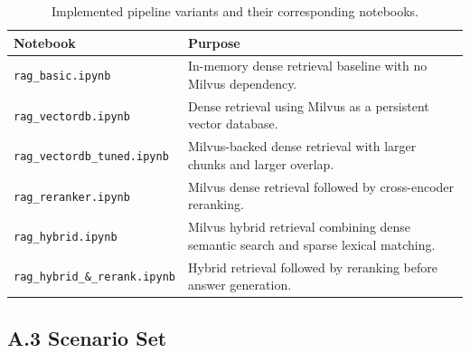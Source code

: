 \begin{table}[H]
\centering
\small
\begin{tabularx}{\textwidth}{>{\raggedright\arraybackslash}p{}>{\raggedright\arraybackslash}X}
\toprule
\textbf{Notebook} & \textbf{Purpose} \\
\midrule
\texttt{rag\_basic.ipynb} & In-memory dense retrieval baseline with no Milvus dependency. \\
\texttt{rag\_vectordb.ipynb} & Dense retrieval using Milvus as a persistent vector database. \\
\texttt{rag\_vectordb\_tuned.ipynb} & Milvus-backed dense retrieval with larger chunks and larger overlap. \\
\texttt{rag\_reranker.ipynb} & Milvus dense retrieval followed by cross-encoder reranking. \\
\texttt{rag\_hybrid.ipynb} & Milvus hybrid retrieval combining dense semantic search and sparse lexical matching. \\
\texttt{rag\_hybrid\_\&\_rerank.ipynb} & Hybrid retrieval followed by reranking before answer generation. \\
\bottomrule
\end{tabularx}
\caption{Implemented pipeline variants and their corresponding notebooks.}
\label{tab:appendix-pipeline-summary}
\end{table}

\subsection*{A.3 Scenario Set}

